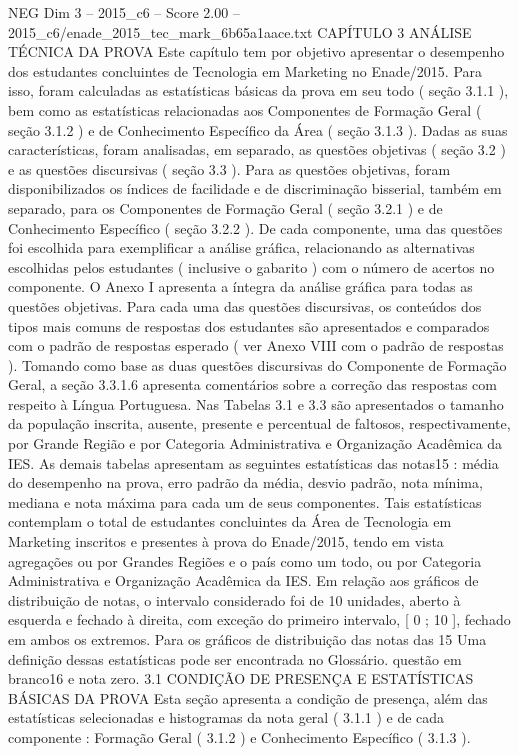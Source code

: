 \begin{textsample}{NEG Dim 3 – 2015\_c6 – Score 2.00 – 2015\_c6/enade\_2015\_tec\_mark\_6b65a1aace.txt}  \label{ex:f3_neg_073}
CAPÍTULO 3 ANÁLISE TÉCNICA DA PROVA Este capítulo tem por objetivo apresentar o desempenho dos estudantes concluintes de Tecnologia em Marketing no Enade/2015.
Para isso, foram calculadas as estatísticas básicas da prova em seu todo ( seção 3.1.1 ), bem como as estatísticas relacionadas aos Componentes de Formação Geral ( seção 3.1.2 ) e de Conhecimento Específico da Área ( seção 3.1.3 ).
Dadas as suas características, foram analisadas, em separado, as questões objetivas ( seção 3.2 ) e as questões discursivas ( seção 3.3 ).
Para as questões objetivas, foram disponibilizados os índices de facilidade e de discriminação bisserial, também em separado, para os Componentes de Formação Geral ( seção 3.2.1 ) e de Conhecimento Específico ( seção 3.2.2 ).
De cada componente, uma das questões foi escolhida para exemplificar a análise gráfica, relacionando as alternativas escolhidas pelos estudantes ( inclusive o gabarito ) com o número de acertos no componente.
O Anexo I apresenta a íntegra da análise gráfica para todas as questões objetivas.
Para cada uma das questões discursivas, os conteúdos dos tipos mais comuns de respostas dos estudantes são apresentados e comparados com o padrão de respostas esperado ( ver Anexo VIII com o padrão de respostas ).
Tomando como base as duas questões discursivas do Componente de Formação Geral, a seção 3.3.1.6 apresenta comentários sobre a correção das respostas com respeito à Língua Portuguesa.
Nas Tabelas 3.1 e 3.3 são apresentados o tamanho da população inscrita, ausente, presente e percentual de faltosos, respectivamente, por Grande Região e por Categoria Administrativa e Organização Acadêmica da IES.
As demais tabelas apresentam as seguintes estatísticas das notas15 : média do desempenho na prova, erro padrão da média, desvio padrão, nota mínima, mediana e nota máxima para cada um de seus componentes.
Tais estatísticas contemplam o total de estudantes concluintes da Área de Tecnologia em Marketing inscritos e presentes à prova do Enade/2015, tendo em vista agregações ou por Grandes Regiões e o país como um todo, ou por Categoria Administrativa e Organização Acadêmica da IES.
Em relação aos gráficos de distribuição de notas, o intervalo considerado foi de 10 unidades, aberto à esquerda e fechado à direita, com exceção do primeiro intervalo, [ 0 ; 10 ], fechado em ambos os extremos.
Para os gráficos de distribuição das notas das 15 Uma definição dessas estatísticas pode ser encontrada no Glossário. questão em branco16 e nota zero. 3.1 CONDIÇÃO DE PRESENÇA E ESTATÍSTICAS BÁSICAS DA PROVA Esta seção apresenta a condição de presença, além das estatísticas selecionadas e histogramas da nota geral ( 3.1.1 ) e de cada componente : Formação Geral ( 3.1.2 ) e Conhecimento Específico ( 3.1.3 ).

\end{textsample}
